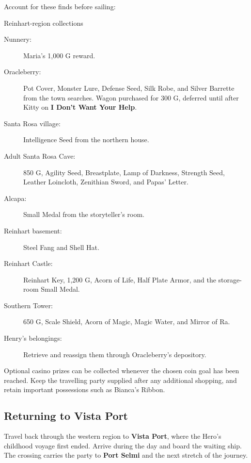 Account for these finds before sailing:
\begin{routecheck}{Reinhart-region collections}
\begin{description}
  \item[Nunnery:] Maria's 1,000 G reward.
  \item[Oracleberry:] Pot Cover, Monster Lure, Defense Seed, Silk Robe,
    and Silver Barrette from the town searches. Wagon purchased for 300 G,
    deferred until after Kitty on \textbf{I Don't Want Your Help}.
  \item[Santa Rosa village:] Intelligence Seed from the northern house.
  \item[Adult Santa Rosa Cave:] 850 G, Agility Seed, Breastplate, Lamp
    of Darkness, Strength Seed, Leather Loincloth, Zenithian Sword,
    and Papas' Letter.
  \item[Alcapa:] Small Medal from the storyteller's room.
  \item[Reinhart basement:] Steel Fang and Shell Hat.
  \item[Reinhart Castle:] Reinhart Key, 1,200 G, Acorn of Life,
    Half Plate Armor, and the storage-room Small Medal.
  \item[Southern Tower:] 650 G, Scale Shield, Acorn of Magic,
    Magic Water, and Mirror of Ra.
  \item[Henry's belongings:] Retrieve and reassign them through
    Oracleberry's depository.
\end{description}
\end{routecheck}

Optional casino prizes can be collected whenever the chosen coin goal
has been reached. Keep the travelling party supplied after any additional
shopping, and retain important possessions such as Bianca's Ribbon.

\subsection*{Returning to Vista Port}

Travel back through the western region to \textbf{Vista Port}, where
the Hero's childhood voyage first ended. Arrive during the day and
board the waiting ship. The crossing carries the party to
\textbf{Port Selmi} and the next stretch of the journey.

